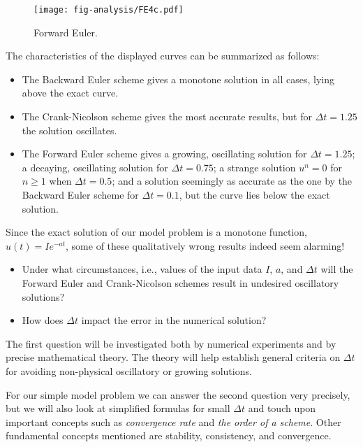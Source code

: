 \documentclass[graybox,sectrefs,envcountresetchap,open=right,final]{svmonodo}
\newenvironment{notice_mdfboxadmon}[1][]{
\begin{notice_mdfboxmdframed}[frametitle=#1]
}
{
\end{notice_mdfboxmdframed}
}
\begin{document}
\begin{figure}[!ht]  %
  \centerline{\texttt{[image: fig-analysis/FE4c.pdf]}}
  \caption{
  Forward Euler. \label{decay:analysis:FE4c}
  }
\end{figure}


The characteristics of the displayed curves can be summarized as follows:

\begin{itemize}
  \item The Backward Euler scheme gives a monotone solution in all cases,
    lying above the exact curve.

  \item The Crank-Nicolson scheme gives the most accurate results, but for
    $\Delta t=1.25$ the solution oscillates.

  \item The Forward Euler scheme gives a growing, oscillating solution for
    $\Delta t=1.25$; a decaying, oscillating solution for $\Delta t=0.75$;
    a strange solution $u^n=0$ for $n\geq 1$ when $\Delta t=0.5$; and
    a solution seemingly as accurate as the one by the Backward Euler
    scheme for $\Delta t = 0.1$, but the curve lies below the exact
    solution.
\end{itemize}

\noindent
Since the exact solution of our model problem is a monotone function,
$u(t)=Ie^{-at}$, some of these qualitatively wrong results indeed seem alarming!


\begin{notice_mdfboxadmon}

\begin{itemize}
 \item Under what circumstances, i.e., values of
   the input data $I$, $a$, and $\Delta t$ will the Forward Euler and
   Crank-Nicolson schemes result in undesired oscillatory solutions?

 \item How does $\Delta t$ impact the error in the numerical solution?
\end{itemize}

\noindent
The first question will be investigated both by numerical experiments and
by precise mathematical theory. The theory will help establish
general criteria on $\Delta t$ for avoiding non-physical oscillatory
or growing solutions.

For our simple model problem we can answer the second
question very precisely, but
we will also look at simplified formulas for small $\Delta t$
and touch upon important concepts such as \emph{convergence rate} and
\emph{the order of a scheme}. Other fundamental concepts mentioned are
stability, consistency, and convergence.
\end{notice_mdfboxadmon}
\end{document}
